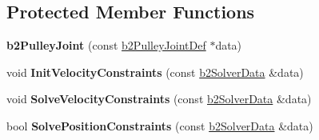 \subsection*{Protected Member Functions}
\begin{DoxyCompactItemize}
\item 
\hypertarget{classb2_pulley_joint_aca1b8dc6fb05c134ccbc0423674c1867}{{\bfseries b2\-Pulley\-Joint} (const \hyperlink{structb2_pulley_joint_def}{b2\-Pulley\-Joint\-Def} $\ast$data)}\label{classb2_pulley_joint_aca1b8dc6fb05c134ccbc0423674c1867}

\item 
\hypertarget{classb2_pulley_joint_a1b339ba58e82261beeb55f9ab04cfa7e}{void {\bfseries Init\-Velocity\-Constraints} (const \hyperlink{structb2_solver_data}{b2\-Solver\-Data} \&data)}\label{classb2_pulley_joint_a1b339ba58e82261beeb55f9ab04cfa7e}

\item 
\hypertarget{classb2_pulley_joint_a517858e93e24f3daa51be4873b22c2c3}{void {\bfseries Solve\-Velocity\-Constraints} (const \hyperlink{structb2_solver_data}{b2\-Solver\-Data} \&data)}\label{classb2_pulley_joint_a517858e93e24f3daa51be4873b22c2c3}

\item 
\hypertarget{classb2_pulley_joint_a8fcdd728e02b7c89372bf11b7732d976}{bool {\bfseries Solve\-Position\-Constraints} (const \hyperlink{structb2_solver_data}{b2\-Solver\-Data} \&data)}\label{classb2_pulley_joint_a8fcdd728e02b7c89372bf11b7732d976}

\end{DoxyCompactItemize}
